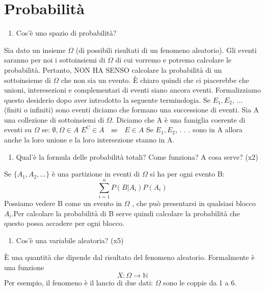 \section{Probabilità}

 \begin{enumerate}[resume]\bfseries
\item Cos'è uno spazio di probabilità?
\end{enumerate}
Sia dato un insieme $\Omega$ (di possibili risultati di un fenomeno aleatorio). Gli eventi saranno per noi i
sottoinsiemi di $\Omega$ di cui vorremo e potremo calcolare le probabilità. Pertanto, NON HA SENSO calcolare la probabilità di un sottoinsieme di $\Omega$ che non sia un evento. È chiaro quindi che ci piacerebbe che unioni, interesezioni e complementari di eventi siano ancora eventi. Formalizziamo questo desiderio dopo aver introdotto la seguente terminologia. Se $E_1, E_2$, ... (finiti o infiniti) sono eventi diciamo che formano una successione di eventi.\newline
Sia A una collezione di sottoinsiemi di $\Omega$. Diciamo che A è una famiglia coerente di eventi
su $\Omega$ se:\newline
$\emptyset, \Omega \in A$\newline
$E^C \in A \quad \text{se}\quad E \in A$\newline
Se $E_1, E_2$, . . . sono in A allora anche la loro unione e la loro intersezione stanno in A.
\begin{enumerate}[resume]\bfseries
\item Qual'è la formula delle probabilità totali? Come funziona? A cosa serve? (x2)
\end{enumerate}
Se $\{A_1,A_2,...\}$ è una partizione in eventi di $\Omega$ si ha per ogni evento B:
\[\sum_{i=1}^{n} P(B\vert A_i)P(A_i)\]
Possiamo vedere B come un evento in $\Omega$ , che può presentarsi in qualsiasi blocco $A_i$.\newline Per calcolare la probabilità di B serve quindi calcolare la probabilità che questo possa accadere per ogni blocco.
\begin{enumerate}[resume]\bfseries
\item Cos'è una variabile aleatoria? (x5)
\end{enumerate}
È una quantità che dipende dal risultato del fenomeno aleatorio. Formalmente è una funzione
\[ X: \Omega  \to \mathbb{N} \]
Per esempio, il fenomeno è il lancio di due dati:\newline
$\Omega$ sono le coppie da 1 a 6.\newline
